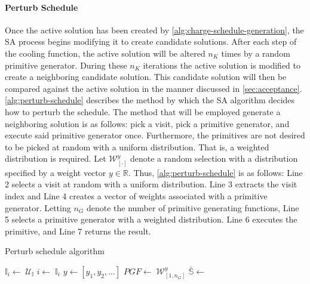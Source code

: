 \documentclass[11pt,a4paper,final]{article}
\newcommand{\I}{\mathbb{I}}                 %
\newcommand{\C}{\mathbb{C}}                 %
\newcommand{\U}{\mathcal{U}}                %
\newcommand{\W}{\mathcal{W}}                %
\newcommand{\Sol}{\mathbb{S}}               %
\begin{document}
\paragraph{Perturb Schedule}
\label{sec:tweak-schedule}
Once the active solution has been created by \ref{alg:charge-schedule-generation}, the SA process begins modifying it to
create candidate solutions. After each step of the cooling function, the active solution will be altered \(n_K\) times by
a random primitive generator. During these \(n_K\) iterations the active solution is modified to create a neighboring
candidate solution. This candidate solution will then be compared against the active solution in the manner discussed in
\ref{sec:acceptance}. \ref{alg:perturb-schedule} describes the method by which the SA algorithm decides how to perturb the
schedule. The method that will be employed generate a neighboring solution is as follows: pick a visit, pick a primitive
generator, and execute said primitive generator once. Furthermore, the primitives are not desired to be picked at random
with a uniform distribution. That is, a weighted distribution is required. Let \(\W^y_{[\cdot]}\) denote a random selection
with a distribution specified by a weight vector \(y \in \mathbb{R}\). Thus, \ref{alg:perturb-schedule} is as follows: Line 2 selects
a visit at random with a uniform distribution. Line 3 extracts the visit index and Line 4 creates a vector of weights
associated with a primitive generator. Letting \(n_G\) denote the number of primitive generating functions, Line 5 selects
a primitive generator with a weighted distribution. Line 6 executes the primitive, and Line 7 returns the result.

\begin{algorithm}[H]
\scriptsize
\caption{Perturb schedule algorithm} \label{alg:perturb-schedule}

    \LinesNumbered
    \KwIn{$\Sol$}
    \KwOut{$\bar{\Sol}$}


    \Begin
    {
        $\I_i\leftarrow\; \U_{\I}$
        $i \leftarrow\; \I_i$
        $y \leftarrow [y_1, y_2, ...]$
        $PGF \leftarrow\; \W^y_{[1,n_G]}$
        $\bar{\Sol} \leftarrow$ \PGF{($i$, $\I$, $\C$)}
        \Return{($0, \bar{\I}$, $\bar{\C}$)}
    }
\end{algorithm}
\end{document}
